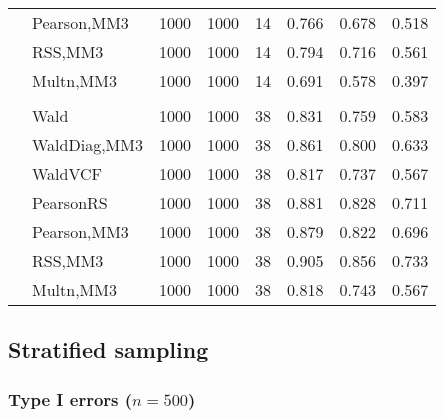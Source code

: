 \documentclass[
]{article}
\begin{document}
\begin{table}[H]
{\begin{tabular}[t]{llrrrrrr}
\hspace{1em} & Pearson,MM3 & 1000 & 1000 & 14 & 0.766 & 0.678 & 0.518\\

\hspace{1em} & RSS,MM3 & 1000 & 1000 & 14 & 0.794 & 0.716 & 0.561\\

\hspace{1em} & Multn,MM3 & 1000 & 1000 & 14 & 0.691 & 0.578 & 0.397\\
\cmidrule{1-8}
\addlinespace[0.3em]
\multicolumn{8}{l}{\textbf{3F 15V}}\\
\hspace{1em} & Wald & 1000 & 1000 & 38 & 0.831 & 0.759 & 0.583\\

\hspace{1em} & WaldDiag,MM3 & 1000 & 1000 & 38 & 0.861 & 0.800 & 0.633\\

\hspace{1em} & WaldVCF & 1000 & 1000 & 38 & 0.817 & 0.737 & 0.567\\

\hspace{1em} & PearsonRS & 1000 & 1000 & 38 & 0.881 & 0.828 & 0.711\\

\hspace{1em} & Pearson,MM3 & 1000 & 1000 & 38 & 0.879 & 0.822 & 0.696\\

\hspace{1em} & RSS,MM3 & 1000 & 1000 & 38 & 0.905 & 0.856 & 0.733\\

\hspace{1em} & Multn,MM3 & 1000 & 1000 & 38 & 0.818 & 0.743 & 0.567\\
\bottomrule
\end{tabular}}
\end{table}

\hypertarget{stratified-sampling}{%
\subsection{Stratified sampling}\label{stratified-sampling}}

\hypertarget{type-i-errors-n500-1}{%
\subsubsection{\texorpdfstring{Type I errors
(\(n=500\))}{Type I errors (n=500)}}\label{type-i-errors-n500-1}}
\end{document}
